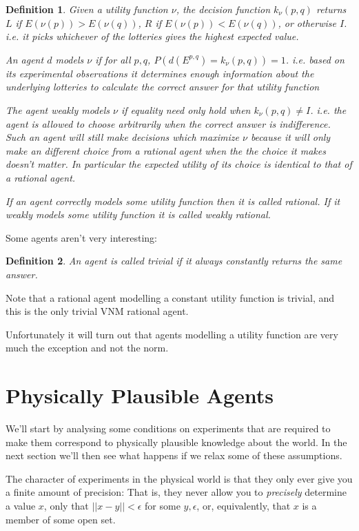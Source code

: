 \documentclass[a4paper]{book}
\newtheorem{definition}{Definition}
\begin{document}
\begin{definition}
Given a utility function $\nu$, the decision function $k_\nu(p, q)$ returns
$L$ if $E(\nu(p)) > E(\nu(q))$, $R$ if $E(\nu(p)) < E(\nu(q))$, or otherwise
$I$. i.e. it picks whichever of the lotteries gives the highest expected
value.

An agent $d$ models $\nu$ if 
for all $p, q$, $P(d(E^{p, q}) = k_\nu(p, q)) = 1$. i.e. based on its
experimental observations it determines enough information about the underlying
lotteries to calculate the correct answer for that utility function

The agent weakly models $\nu$ if equality need only hold when $k_\nu(p, q) \neq I$.
i.e. the agent is allowed to choose arbitrarily when the correct answer is
indifference. Such an agent will still make decisions which maximize $\nu$ because
it will only make an different choice from a rational agent when the the
choice it makes doesn't matter. In particular the expected utility of its choice
is identical to that of a rational agent.

If an agent correctly models some utility function then it is called rational.
If it weakly models some utility function it is called weakly rational.
\end{definition}

Some agents aren't very interesting:

\begin{definition}
An agent is called trivial if it always constantly returns the same answer.
\end{definition}

Note that a rational agent modelling a constant utility function is trivial,
and this is the only trivial VNM rational agent.

Unfortunately it will turn out that agents modelling a utility function
are very much the exception and not the norm.

\section{Physically Plausible Agents}

We'll start by analysing some conditions on experiments that are required
to make them correspond to physically plausible knowledge about the world.
In the next section we'll then see what happens if we relax some of these
assumptions.

The character of experiments in the physical world is that they only ever
give you a finite amount of precision: That is, they never allow you to
\textit{precisely} determine a value $x$,
only that $||x - y|| < \epsilon$
for some $y, \epsilon$,
or, equivalently, that $x$
is a member of some open set.
\end{document}
